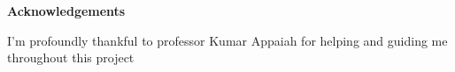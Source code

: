 \begin{center}
\thispagestyle{empty}
\LARGE{\textbf{Acknowledgements}}\\[1cm]
\end{center}
\linespread{1.13}
\large{} I'm profoundly thankful to professor Kumar Appaiah for helping and guiding me throughout this project
\newpage
